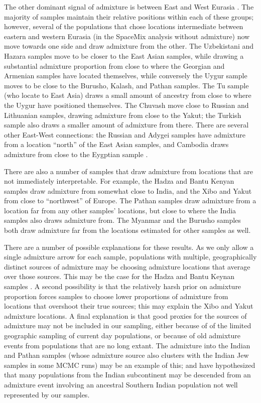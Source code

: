 \documentclass[12pt]{article}
\begin{document}
The other dominant signal of admixture is between East and West Eurasia \citep[a signal documented by many authors:][]{rosenberg_genetic_2002,li_worldwide_2008, xu_genome-wide_2008,Hellenthal}. The majority of samples maintain their relative positions within each of these groups; however, several of the populations that chose locations intermediate between eastern and western Eurasia (in the SpaceMix analysis without admixture) now move towards one side and draw admixture from the other.  The Uzbekistani and Hazara samples move to be closer to the East Asian samples, while drawing a substantial admixture proportion from close to where the Georgian and Armenian samples have located themselves, while conversely the Uygur sample moves to be close to the Burusho, Kalash, and Pathan samples. The Tu sample (who locate to East Asia) draws a small amount of ancestry from close to where the Uygur have positioned themselves. The Chuvash move close to Russian and Lithuanian samples, drawing admixture from close to the Yakut; the Turkish sample also draws a smaller amount of admixture from there. There are several other East-West connections: the Russian and Adygei samples have admixture from a location ``north'' of the East Asian samples, and Cambodia draws admixture from close to the Eygptian sample \citep{Treemix, Hellenthal}. 

There are also a number of samples that draw admixture from locations that are not immediately interpretable.  For example, the Hadza and Bantu Kenyan samples draw admixture from somewhat close to India, 
and the Xibo and Yakut from close to ``northwest'' of Europe.  
The Pathan samples draw admixture from a location far from any other samples' locations, but close to where the India samples also draws admixture from. 
The Myanmar and the Burusho samples both draw admixture far from the locations estimated for other samples as well.

There are a number of possible explanations for these results. As we only allow a single admixture arrow for each sample, populations with multiple, geographically distinct sources of admixture may be choosing admixture locations that average over those sources. This may be the case for the Hadza and Bantu Keynan samples \citep{Hellenthal}.  A second possibility is that the relatively harsh prior on admixture proportion forces samples to choose lower proportions of admixture from locations that overshoot their true sources; this may explain the Xibo and Yakut admixture locations. A final explanation is that good proxies for the sources of admixture may not be included in our sampling, either because of of the limited geographic sampling of current day populations, or because of old admixture events from populations that are no long extant. The admixture into the Indian and Pathan samples (whose admixture source also clusters with the Indian Jew samples in some MCMC runs) may be an example of this; \citet{reich_india_2009} and \citet{moorjani_india_2013} have hypothesized that many populations from the Indian subcontinent may be descended from an admixture event involving an ancestral Southern Indian population not well represented by our samples. 
\end{document}
